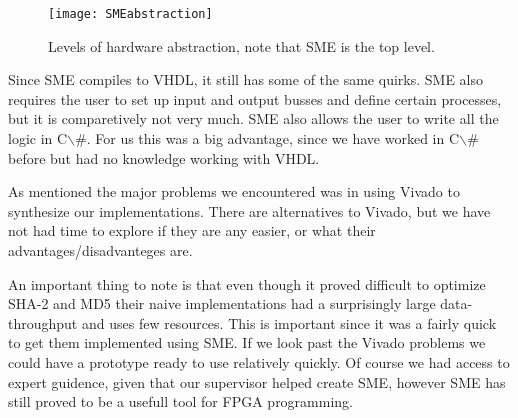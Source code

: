 \documentclass[a4paper, openany]{book}
\begin{document}
\begin{abstact}
\begin{figure}[H]
  \centering
  \texttt{[image: SMEabstraction]}
  \caption{Levels of hardware abstraction, note that SME is the top level.}
\end{figure}

Since SME compiles to VHDL, it still has some of the same quirks. SME also requires the user to set up input and output busses and define certain processes,
but it is comparetively not very much. SME also allows the user to write all the logic in C$\backslash$#.
For us this was a big advantage, since we have worked in C$\backslash$# before but had no knowledge working with VHDL.

As mentioned the major problems we encountered was in using Vivado to synthesize our implementations.
There are alternatives to Vivado, but we have not had time to explore if they are any easier, or what their advantages/disadvanteges are.

An important thing to note is that even though it proved difficult to optimize SHA-2 and MD5 their naive implementations had a
surprisingly large data-throughput and uses few resources. This is important since it was a fairly quick to get them implemented using SME.
If we look past the Vivado problems we could have a prototype ready to use relatively quickly.
Of course we had access to expert guidence, given that our supervisor helped create SME, however SME has still proved to be a usefull tool for FPGA programming.

\end{abstact}
\end{document}
